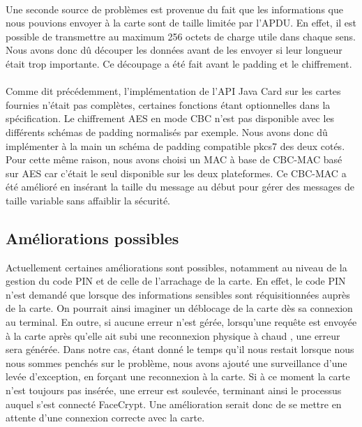 \documentclass[a4paper,11pt,french]{article}
\begin{document}
\paragraph{}
Une seconde source de problèmes est provenue du fait que les informations que nous
 pouvions envoyer à la carte sont de taille limitée par l'APDU. En effet, il est possible de transmettre au maximum 256 octets de charge utile dans chaque sens. Nous avons donc dû découper les données avant de les envoyer 
si leur longueur était trop importante.
Ce découpage a été fait avant le padding et le chiffrement.


\paragraph{}
Comme dit précédemment, l'implémentation de l'API Java Card sur les cartes fournies n'était pas complètes, certaines fonctions étant optionnelles dans la 
spécification. Le chiffrement AES en mode CBC n'est pas disponible avec les différents schémas de padding normalisés par exemple. Nous avons donc dû implémenter 
à la main un schéma de padding compatible pkcs7 des deux cotés.
Pour cette même raison, nous avons choisi un MAC à base de CBC-MAC basé sur AES car c'était le seul disponible sur les deux plateformes.
Ce CBC-MAC a été amélioré en insérant la taille du message au début pour gérer des messages de taille variable sans affaiblir la sécurité. 






\subsection{Améliorations possibles}
Actuellement certaines améliorations sont possibles, notamment au niveau
de la gestion du code PIN et de celle de l'arrachage de la carte. En effet,
le code PIN n'est demandé que lorsque des informations sensibles sont
réquisitionnées auprès de la carte. On pourrait ainsi imaginer un déblocage
de la carte dès sa connexion au terminal. En outre, si aucune erreur n'est gérée,
lorsqu'une requête est envoyée à la carte après qu'elle ait subi une reconnexion
physique \og à chaud \fg{}, une erreur sera générée. Dans notre cas, étant donné
le temps qu'il nous restait lorsque nous nous sommes penchés sur le problème, 
nous avons ajouté une surveillance d'une levée d'exception, en forçant une 
reconnexion à la carte. Si à ce moment la carte n'est toujours pas insérée,
une erreur est soulevée, terminant ainsi le processus auquel s'est connecté
FaceCrypt. Une amélioration serait donc de se mettre en attente d'une connexion
correcte avec la carte.
\end{document}
